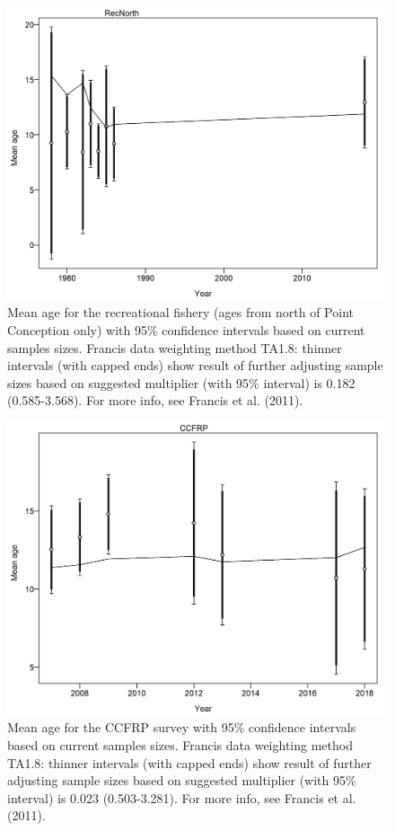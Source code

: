 \documentclass[12pt,]{article}
\begin{document}
\FloatBarrier

\begin{figure}
\centering
\includegraphics{r4ss/plots_mod1/comp_condAALfit_data_weighting_TA1.8_condAgeRecNorth.png}
\caption{Mean age for the recreational fishery (ages from north of Point
Conception only) with 95\% confidence intervals based on current samples
sizes. Francis data weighting method TA1.8: thinner intervals (with
capped ends) show result of further adjusting sample sizes based on
suggested multiplier (with 95\% interval) is 0.182 (0.585-3.568). For
more info, see Francis et al. (2011).
\label{fig:comp_condAALfit_data_weighting_TA1.8_condAgeRecNorth}}
\end{figure}

\begin{figure}
\centering
\includegraphics{r4ss/plots_mod1/comp_condAALfit_data_weighting_TA1.8_condAgeCCFRP.png}
\caption{Mean age for the CCFRP survey with 95\% confidence intervals
based on current samples sizes. Francis data weighting method TA1.8:
thinner intervals (with capped ends) show result of further adjusting
sample sizes based on suggested multiplier (with 95\% interval) is 0.023
(0.503-3.281). For more info, see Francis et al. (2011).
\label{fig:comp_condAALfit_data_weighting_TA1.8_condAgeCCFRP}}
\end{figure}
\end{document}
